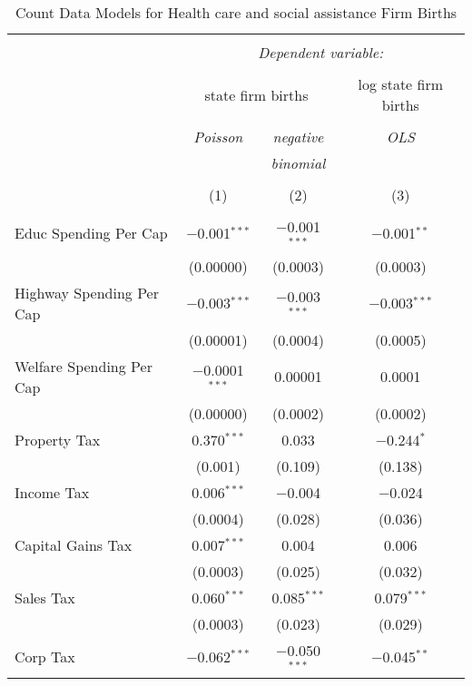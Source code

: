
\begin{table}[!htbp] \centering 
  \caption{Count Data Models for Health care and social assistance Firm Births} 
  \label{} 
\begin{tabular}{@{\extracolsep{5pt}}lccc} 
\\[-1.8ex]\hline 
\hline \\[-1.8ex] 
 & \multicolumn{3}{c}{\textit{Dependent variable:}} \\ 
\cline{2-4} 
\\[-1.8ex] & \multicolumn{2}{c}{state firm births} & log state firm births \\ 
\\[-1.8ex] & \textit{Poisson} & \textit{negative} & \textit{OLS} \\ 
 & \textit{} & \textit{binomial} & \textit{} \\ 
\\[-1.8ex] & (1) & (2) & (3)\\ 
\hline \\[-1.8ex] 
 Educ Spending Per Cap & $-$0.001$^{***}$ & $-$0.001$^{***}$ & $-$0.001$^{**}$ \\ 
  & (0.00000) & (0.0003) & (0.0003) \\ 
  Highway Spending Per Cap  & $-$0.003$^{***}$ & $-$0.003$^{***}$ & $-$0.003$^{***}$ \\ 
  & (0.00001) & (0.0004) & (0.0005) \\ 
  Welfare Spending Per Cap  & $-$0.0001$^{***}$ & 0.00001 & 0.0001 \\ 
  & (0.00000) & (0.0002) & (0.0002) \\ 
  Property Tax & 0.370$^{***}$ & 0.033 & $-$0.244$^{*}$ \\ 
  & (0.001) & (0.109) & (0.138) \\ 
  Income Tax & 0.006$^{***}$ & $-$0.004 & $-$0.024 \\ 
  & (0.0004) & (0.028) & (0.036) \\ 
  Capital Gains Tax & 0.007$^{***}$ & 0.004 & 0.006 \\ 
  & (0.0003) & (0.025) & (0.032) \\ 
  Sales Tax & 0.060$^{***}$ & 0.085$^{***}$ & 0.079$^{***}$ \\ 
  & (0.0003) & (0.023) & (0.029) \\ 
  Corp Tax & $-$0.062$^{***}$ & $-$0.050$^{***}$ & $-$0.045$^{**}$ \\ 

\end{tabular}
\end{table}
